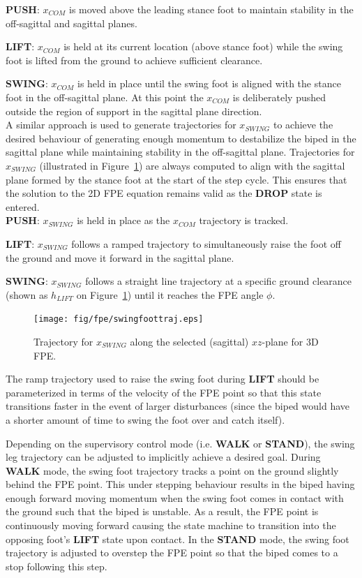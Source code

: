 \textbf{PUSH}: $x_{COM}$ is moved above the leading stance foot to maintain stability in the off-sagittal and sagittal planes.

\textbf{LIFT}: $x_{COM}$ is held at its current location (above stance foot) while the swing foot is lifted from the ground to achieve sufficient clearance.

\textbf{SWING}: $x_{COM}$ is held in place until the swing foot is aligned with the stance foot in the off-sagittal plane. At this point the $x_{COM}$ is deliberately pushed outside the region of support in the sagittal plane direction. \\

A similar approach is used to generate trajectories for $x_{SWING}$ to achieve the desired behaviour of generating enough momentum to destabilize the biped in the sagittal plane while maintaining stability in the off-sagittal plane. Trajectories for $x_{SWING}$ (illustrated in Figure~\ref{fig:swingfoottraj}) are always computed to align with the sagittal plane formed by the stance foot at the start of the step cycle. This ensures that the solution to the 2D FPE equation remains valid as the \textbf{DROP} state is entered. \\

\textbf{PUSH}: $x_{SWING}$ is held in place as the $x_{COM}$ trajectory is tracked.

\textbf{LIFT}: $x_{SWING}$ follows a ramped trajectory to simultaneously raise the foot off the ground and move it forward in the sagittal plane.

\textbf{SWING}: $x_{SWING}$ follows a straight line trajectory at a specific ground clearance (shown as $h_{LIFT}$ on Figure~\ref{fig:swingfoottraj}) until it reaches the FPE angle $\phi$. \\

\begin{figure}[!h]
	\centering
    \texttt{[image: fig/fpe/swingfoottraj.eps]} 
  	\caption{Trajectory for $x_{SWING}$ along the selected (sagittal) $xz$-plane for 3D FPE.}
	\label{fig:swingfoottraj}
\end{figure}

The ramp trajectory used to raise the swing foot during \textbf{LIFT} should be parameterized in terms of the velocity of the FPE point so that this state transitions faster in the event of larger disturbances (since the biped would have a shorter amount of time to swing the foot over and catch itself).

Depending on the supervisory control mode (i.e. \textbf{WALK} or \textbf{STAND}), the swing leg trajectory can be adjusted to implicitly achieve a desired goal. During \textbf{WALK} mode, the swing foot trajectory tracks a point on the ground slightly behind the FPE point. This under stepping behaviour results in the biped having enough forward moving momentum when the swing foot comes in contact with the ground such that the biped is unstable. As a result, the FPE point is continuously moving forward causing the state machine to transition into the opposing foot's \textbf{LIFT} state upon contact. In the \textbf{STAND} mode, the swing foot trajectory is adjusted to overstep the FPE point so that the biped comes to a stop following this step.

